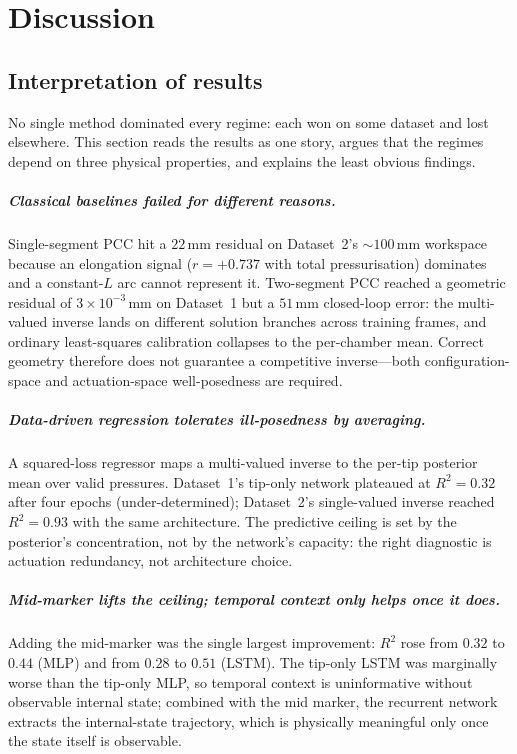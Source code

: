 \chapter{Discussion}
\label{chap:discussion}

\section{Interpretation of results}
\label{sec:disc_interpretation}

No single method dominated every regime: each won on some dataset and lost elsewhere. This section reads the results as one story, argues that the regimes depend on three physical properties, and explains the least obvious findings.

\paragraph{Classical baselines failed for different reasons.}
Single-segment PCC hit a $22$\,mm residual on Dataset~2's $\sim$$100$\,mm workspace because an elongation signal ($r = +0.737$ with total pressurisation) dominates and a constant-$L$ arc cannot represent it. Two-segment PCC reached a geometric residual of $3 \times 10^{-3}$\,mm on Dataset~1 but a $51$\,mm closed-loop error: the multi-valued inverse lands on different solution branches across training frames, and ordinary least-squares calibration collapses to the per-chamber mean. Correct geometry therefore does not guarantee a competitive inverse---both configuration-space and actuation-space well-posedness are required.

\paragraph{Data-driven regression tolerates ill-posedness by averaging.}
A squared-loss regressor maps a multi-valued inverse to the per-tip posterior mean over valid pressures. Dataset~1's tip-only network plateaued at $R^{2} = 0.32$ after four epochs (under-determined); Dataset~2's single-valued inverse reached $R^{2} = 0.93$ with the same architecture. The predictive ceiling is set by the posterior's concentration, not by the network's capacity: the right diagnostic is actuation redundancy, not architecture choice.

\paragraph{Mid-marker lifts the ceiling; temporal context only helps once it does.}
Adding the mid-marker was the single largest improvement: $R^{2}$ rose from $0.32$ to $0.44$ (MLP) and from $0.28$ to $0.51$ (LSTM). The tip-only LSTM was marginally worse than the tip-only MLP, so temporal context is uninformative without observable internal state; combined with the mid marker, the recurrent network extracts the internal-state trajectory, which is physically meaningful only once the state itself is observable.

